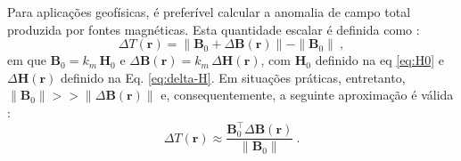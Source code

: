 Para aplicações geofísicas, é preferível calcular a anomalia de campo total produzida por fontes magnéticas. Esta quantidade escalar é definida como \citep{blakely1996}:
\begin{equation}
\Delta {T}({\mathbf{r}}) = \| 
{\mathbf{B}}_{0} + \Delta {\mathbf{B}}({\mathbf{r}}) \|
- \| {\mathbf{B}}_{0} \| \: ,
\label{eq:delta-T-tilde}
\end{equation}
em que ${\mathbf{B}}_{0} = k_{m} \, {\mathbf{H}}_{0}$
e $\Delta {\mathbf{B}}({\mathbf{r}}) = 
k_{m} \, \Delta {\mathbf{H}}({\mathbf{r}})$, com ${\mathbf{H}}_{0}$ definido na eq \ref{eq:H0} e $\Delta {\mathbf{H}}({\mathbf{r}})$ definido na Eq. \ref{eq:delta-H}.
Em situações práticas, entretanto, 
$\| {\mathbf{B}}_{0} \| >> \| \Delta {\mathbf{B}}({\mathbf{r}}) \|$
e, consequentemente, a seguinte aproximação é válida \citep{blakely1996}:
\begin{equation}
\Delta {T}({\mathbf{r}}) \approx  
\frac{{\mathbf{B}}_{0}^{\top} \Delta {\mathbf{B}}({\mathbf{r}})}{\| {\mathbf{B}}_{0} \|} \: .
\label{eq:delta-T-tilde-approx}
\end{equation}